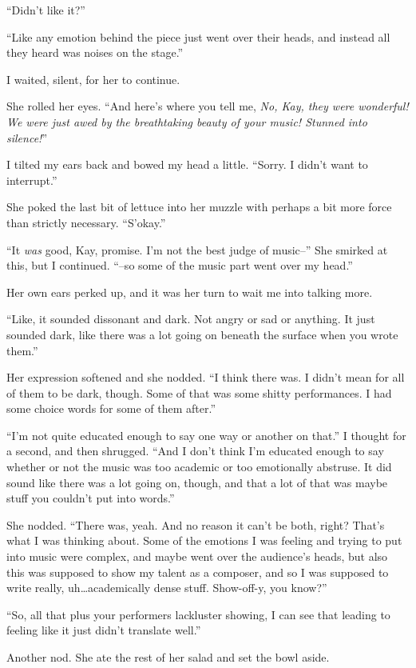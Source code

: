 ``Didn't like it?''

``Like any emotion behind the piece just went over their heads, and instead all they heard was noises on the stage.''

I waited, silent, for her to continue.

She rolled her eyes. ``And here's where you tell me, \emph{No, Kay, they were wonderful! We were just awed by the breathtaking beauty of your music! Stunned into silence!}''

I tilted my ears back and bowed my head a little. ``Sorry. I didn't want to interrupt.''

She poked the last bit of lettuce into her muzzle with perhaps a bit more force than strictly necessary. ``S'okay.''

``It \emph{was} good, Kay, promise. I'm not the best judge of music--'' She smirked at this, but I continued. ``--so some of the music part went over my head.''

Her own ears perked up, and it was her turn to wait me into talking more.

``Like, it sounded dissonant and dark. Not angry or sad or anything. It just sounded dark, like there was a lot going on beneath the surface when you wrote them.''

Her expression softened and she nodded. ``I think there was. I didn't mean for all of them to be dark, though. Some of that was some shitty performances. I had some choice words for some of them after.''

``I'm not quite educated enough to say one way or another on that.'' I thought for a second, and then shrugged. ``And I don't think I'm educated enough to say whether or not the music was too academic or too emotionally abstruse. It did sound like there was a lot going on, though, and that a lot of that was maybe stuff you couldn't put into words.''

She nodded. ``There was, yeah. And no reason it can't be both, right? That's what I was thinking about. Some of the emotions I was feeling and trying to put into music were complex, and maybe went over the audience's heads, but also this was supposed to show my talent as a composer, and so I was supposed to write really, uh\ldots academically dense stuff. Show-off-y, you know?''

``So, all that plus your performers lackluster showing, I can see that leading to feeling like it just didn't translate well.''

Another nod. She ate the rest of her salad and set the bowl aside.

